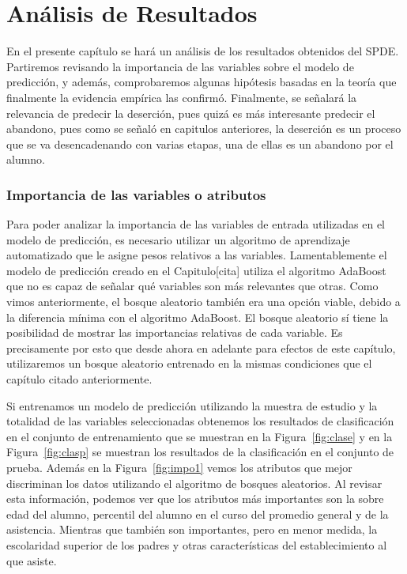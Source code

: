 \chapter{Análisis de Resultados}
\label{ch:anarel}

En el presente capítulo se hará un análisis de los resultados obtenidos del SPDE. Partiremos revisando la importancia de las variables sobre el modelo de predicción, y además, comprobaremos algunas hipótesis basadas en la teoría que finalmente la evidencia empírica las confirmó. Finalmente, se señalará la relevancia de predecir la deserción, pues quizá es más interesante predecir el abandono, pues como se señaló en capitulos anteriores, la deserción es un proceso que se va desencadenando con varias etapas, una de ellas es un abandono por el alumno.

\subsection{Importancia de las variables o atributos}
Para poder analizar la importancia de las variables de entrada utilizadas en el modelo de predicción, es necesario utilizar un algoritmo de aprendizaje automatizado que le asigne pesos relativos a las variables. Lamentablemente el modelo de predicción creado en el Capitulo[cita] utiliza el algoritmo AdaBoost que no es capaz de señalar qué variables son más relevantes que otras. Como vimos anteriormente, el bosque aleatorio también era una opción viable, debido a la diferencia mínima con el algoritmo AdaBoost. El bosque aleatorio sí tiene la posibilidad de mostrar las importancias relativas de cada variable. Es precisamente por esto que desde ahora en adelante para efectos de este capítulo, utilizaremos un bosque aleatorio entrenado en la mismas condiciones que el capítulo citado anteriormente.

Si entrenamos un modelo de predicción utilizando la muestra de estudio y la totalidad de las variables seleccionadas obtenemos los resultados de clasificación en el conjunto de entrenamiento que se muestran en la Figura~\ref{fig:clase} y en la Figura~\ref{fig:clasp} se muestran los resultados de la clasificación en el conjunto de prueba. Además en la Figura~\ref{fig:impo1} vemos los atributos que mejor discriminan los datos utilizando el algoritmo de bosques aleatorios. Al revisar esta información, podemos ver que los atributos más importantes son la sobre edad del alumno, percentil del alumno en el curso del promedio general y de la asistencia. Mientras que también son importantes, pero en menor medida, la escolaridad superior de los padres y otras características del establecimiento al que asiste.

